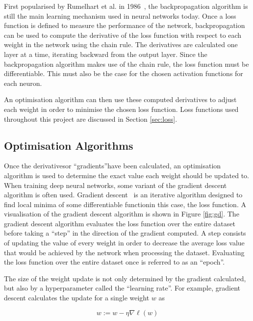 First popularised by Rumelhart et al. in 1986~\cite{rumelhart}, the backpropagation algorithm is still the main learning mechanism used in neural networks today. Once a loss function is defined to measure the performance of the network, backpropagation can be used to compute the derivative of the loss function with respect to each weight in the network using the chain rule. The derivatives are calculated one layer at a time, iterating backward from the output layer. Since the backpropagation algorithm makes use of the chain rule, the loss function must be differentiable. This must also be the case for the chosen activation functions for each neuron.

An optimisation algorithm can then use these computed derivatives to adjust each weight in order to minimise the chosen loss function. Loss functions used throughout this project are discussed in Section \ref{sec:loss}.

\subsection{Optimisation Algorithms}

Once the derivatives\textemdash or ``gradients''\textemdash have been calculated, an optimisation algorithm is used to determine the exact value each weight should be updated to. When training deep neural networks, some variant of the gradient descent algorithm is often used. Gradient descent~\cite[p. 536]{gradient} is an iterative algorithm designed to find local minima of some differentiable function\textemdash in this case, the loss function. A visualisation of the gradient descent algorithm is shown in Figure \ref{fig:gd}. The gradient descent algorithm evaluates the loss function over the entire dataset before taking a ``step'' in the direction of the gradient computed. A step consists of updating the value of every weight in order to decrease the average loss value that would be achieved by the network when processing the dataset. Evaluating the loss function over the entire dataset once is referred to as an ``epoch''.

The size of the weight update is not only determined by the gradient calculated, but also by a hyperparameter called the ``learning rate''. For example, gradient descent calculates the update for a single weight $w$ as

\begin{equation}
    w := w - \eta\nabla\ell(w)
\end{equation}

